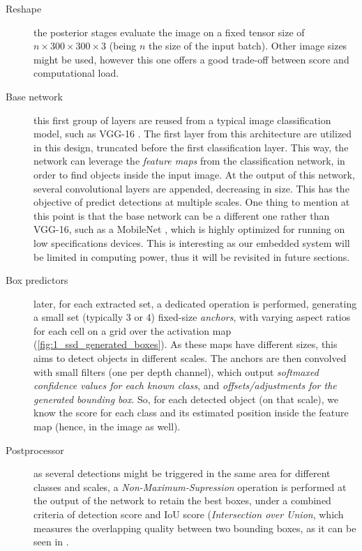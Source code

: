 \begin{description}
	
	\item[Reshape] the posterior stages evaluate the image on a fixed tensor size of $n \times 300 \times 300 \times 3$ (being $n$ the size of the input batch). Other image sizes might be used, however this one offers a good trade-off between score and computational load.
	
	\item [Base network] this first group of layers are reused from a typical image classification model, such as VGG-16 \cite{vgg16}. The first layer from this architecture are utilized in this design, truncated before the first classification layer. This way, the network can leverage the \textit{feature maps} from the classification network, in order to find objects inside the input image. At the output of this network, several convolutional layers are appended, decreasing in size. This has the objective of predict detections at multiple scales. One thing to mention at this point is that the base network can be a different one rather than VGG-16, such as a MobileNet \cite{mobilenet}, which is highly optimized for running on low specifications devices. This is interesting as our embedded system will be limited in computing power, thus it will be revisited in future sections.
	
	\item[Box predictors] later, for each extracted set, a dedicated operation is performed, generating a small set (typically 3 or 4) fixed-size \textit{anchors}, with varying aspect ratios for each cell on a grid over the activation map (\autoref{fig:1_ssd_generated_boxes}). As these maps have different sizes, this aims to detect  objects in different scales. The anchors are then convolved with small filters (one per depth channel), which output \emph{softmaxed confidence values for each known class}, and \emph{offsets/adjustments for the generated bounding box}. So, for each detected object (on that scale), we know the score for each class and its estimated position inside the feature map (hence, in the image as well).
	
	\item [Postprocessor] as several detections might be triggered in the same area for different classes and scales, a \textit{Non-Maximum-Supression} \cite{nms} operation is performed at the output of the network to retain the best boxes, under a combined criteria of detection score and IoU score (\textit{Intersection over Union}, which measures the overlapping quality between two bounding boxes, as it can be seen in .
\end{description}


